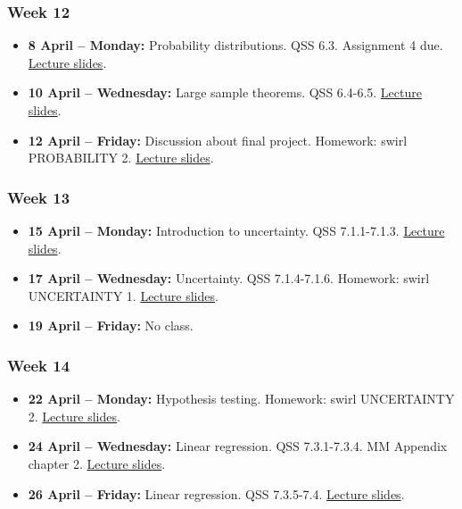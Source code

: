 \documentclass[a4paper,12pt]{article}
\begin{document}
\subsubsection*{Week 12}

\begin{itemize}
	\item \textbf{8 April -- Monday:} Probability distributions. QSS 6.3. Assignment 4 due. \href{https://pols1600.github.io/slides/week11a/week11a.html}{Lecture slides}.
	\item \textbf{10 April -- Wednesday:} Large sample theorems. QSS 6.4-6.5. \href{https://pols1600.github.io/slides/week11b/week11b.html}{Lecture slides}.
	\item \textbf{12 April -- Friday:} Discussion about final project. Homework: swirl PROBABILITY 2. \href{https://pols1600.github.io/slides/week11c/week11c.html}{Lecture slides}.
\end{itemize}

\subsubsection*{Week 13}

\begin{itemize}
	\item \textbf{15 April -- Monday:} Introduction to uncertainty. QSS 7.1.1-7.1.3. \href{https://pols1600.github.io/slides/week12a/week12a.html}{Lecture slides}.
	\item \textbf{17 April -- Wednesday:} Uncertainty. QSS 7.1.4-7.1.6. Homework: swirl UNCERTAINTY 1. \href{https://pols1600.github.io/slides/week12b/week12b.html}{Lecture slides}.
	\item \textbf{19 April -- Friday:} No class. 
\end{itemize}

\subsubsection*{Week 14}

\begin{itemize}
	\item \textbf{22 April -- Monday:} Hypothesis testing. Homework: swirl UNCERTAINTY 2. \href{https://pols1600.github.io/slides/week13a/week13a.html}{Lecture slides}.
	\item \textbf{24 April -- Wednesday:} Linear regression. QSS 7.3.1-7.3.4. MM Appendix chapter 2. \href{https://pols1600.github.io/slides/week13b/week13b.html}{Lecture slides}.
	\item \textbf{26 April -- Friday:} Linear regression. QSS 7.3.5-7.4. \href{https://pols1600.github.io/slides/week13c/week13c.html}{Lecture slides}.
\end{itemize}
\end{document}
